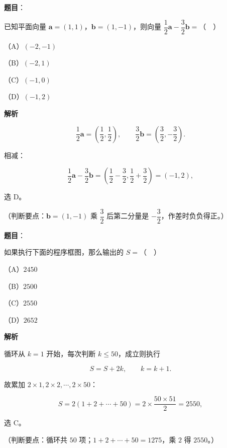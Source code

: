 \begin{answer}

\textbf{题目}：

已知平面向量 $\boldsymbol a=(1,1)$，$\boldsymbol b=(1,-1)$，则向量 $\dfrac12\boldsymbol a-\dfrac32\boldsymbol b=$（　）

（A）$(-2,-1)$

（B）$(-2,1)$

（C）$(-1,0)$

（D）$(-1,2)$

\textbf{解析}

\nopagebreak[4]
\[\frac12\boldsymbol a=\left(\frac12,\frac12\right),\qquad \frac32\boldsymbol b=\left(\frac32,-\frac32\right).\]

相减：

\nopagebreak[4]
\[\frac12\boldsymbol a-\frac32\boldsymbol b=\left(\frac12-\frac32,\frac12+\frac32\right)=(-1,2),\]

选 D。

（判断要点：$\boldsymbol b=(1,-1)$ 乘 $\dfrac32$ 后第二分量是 $-\dfrac32$，作差时负负得正。）


\end{answer}
\begin{answer}

\textbf{题目}：

如果执行下面的程序框图，那么输出的 $S=$（　）
\nopagebreak[4]
\begin{center}\end{center}
\nopagebreak[4]
（A）$2450$

（B）$2500$

（C）$2550$

（D）$2652$

\textbf{解析}

循环从 $k=1$ 开始，每次判断 $k\leqslant50$，成立则执行

\nopagebreak[4]
\[S=S+2k,\qquad k=k+1.\]

故累加 $2\times1,2\times2,\cdots,2\times50$：

\nopagebreak[4]
\[S=2(1+2+\cdots+50)=2\times\frac{50\times51}{2}=2550,\]

选 C。

（判断要点：循环共 $50$ 项；$1+2+\cdots+50=1275$，乘 $2$ 得 $2550$。）


\end{answer}
